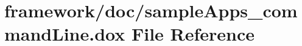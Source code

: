 \hypertarget{sample_apps__command_line_8dox}{}\section{framework/doc/sample\+Apps\+\_\+command\+Line.dox File Reference}
\label{sample_apps__command_line_8dox}
